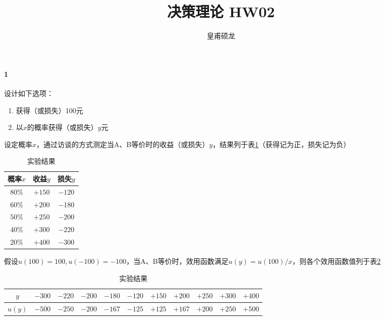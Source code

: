 \documentclass[UTF8]{ctexart}
\title{决策理论 HW02}
\author{皇甫硕龙}
\begin{document}
    \maketitle

    \paragraph*{1} 设计如下选项：

    \begin{enumerate}[label=\Alph*.]
        \item 获得（或损失）100元
        \item 以$x$的概率获得（或损失）$y$元
    \end{enumerate}

    设定概率$x$，通过访谈的方式测定当A、B等价时的收益（或损失）$y$，结果列于表\ref{tbl:result}（获得记为正，损失记为负）

    \begin{table}[ht]
        \centering
        \footnotesize
        \caption{实验结果}
        \begin{tabular}{ccc}
            \toprule
            概率$x$ & 收益$y$ & 损失$y$ \\
            \midrule
            $80\%$ & $+150$ & $-120$ \\
            $60\%$ & $+200$ & $-180$ \\
            $50\%$ & $+250$ & $-200$ \\
            $40\%$ & $+300$ & $-220$ \\
            $20\%$ & $+400$ & $-300$ \\
            \bottomrule
        \end{tabular}
        \label{tbl:result}
    \end{table}

    假设$u(100) = 100, u(-100) = -100$，当A、B等价时，效用函数满足$u(y) = u(100) / x$，则各个效用函数值列于表\ref{tbl:utility}

    \begin{table}[ht]
        \centering
        \footnotesize
        \caption{实验结果}
        \begin{tabular}{*{11}{c}}
            \toprule
            $y$ & $-300$ & $-220$ & $-200$ & $-180$ & $-120$ & $+150$ & $+200$ & $+250$ & $+300$ & $+400$ \\
            \midrule
            $u(y)$ & $-500$ & $-250$ & $-200$ & $-167$ & $-125$ & $+125$ & $+167$ & $+200$ & $+250$ & $+500$ \\
            \bottomrule
        \end{tabular}
        \label{tbl:utility}
    \end{table}
\end{document}
